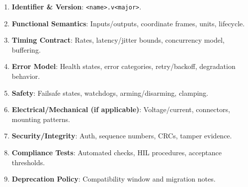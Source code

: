 \begin{enumerate}
\item \textbf{Identifier \& Version}: \texttt{<name>.v<major>}.
\item \textbf{Functional Semantics}: Inputs/outputs, coordinate frames, units, lifecycle.
\item \textbf{Timing Contract}: Rates, latency/jitter bounds, concurrency model, buffering.
\item \textbf{Error Model}: Health states, error categories, retry/backoff, degradation behavior.
\item \textbf{Safety}: Failsafe states, watchdogs, arming/disarming, clamping.
\item \textbf{Electrical/Mechanical (if applicable)}: Voltage/current, connectors, mounting patterns.
\item \textbf{Security/Integrity}: Auth, sequence numbers, CRCs, tamper evidence.
\item \textbf{Compliance Tests}: Automated checks, HIL procedures, acceptance thresholds.
\item \textbf{Deprecation Policy}: Compatibility window and migration notes.
\end{enumerate}

